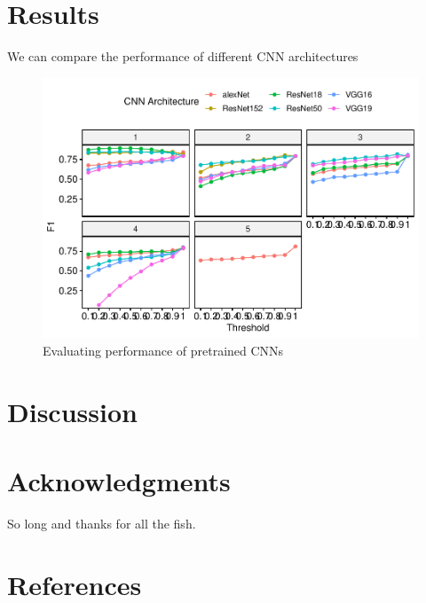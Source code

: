 \documentclass{article}
\begin{document}
\hypertarget{results}{%
\section{Results}\label{results}}

We can compare the performance of different CNN architectures

\begin{figure}[h]

\includegraphics{gibbonNetRMSarxiv_files/figure-latex/unnamed-chunk-2-1} \hfill{}

\caption{Evaluating performance of pretrained CNNs}\label{fig:unnamed-chunk-2}
\end{figure}

\hypertarget{discussion}{%
\section{Discussion}\label{discussion}}

\hypertarget{acknowledgments}{%
\section{Acknowledgments}\label{acknowledgments}}

So long and thanks for all the fish.

\hypertarget{references}{%
\section*{References}\label{references}}
\end{document}
